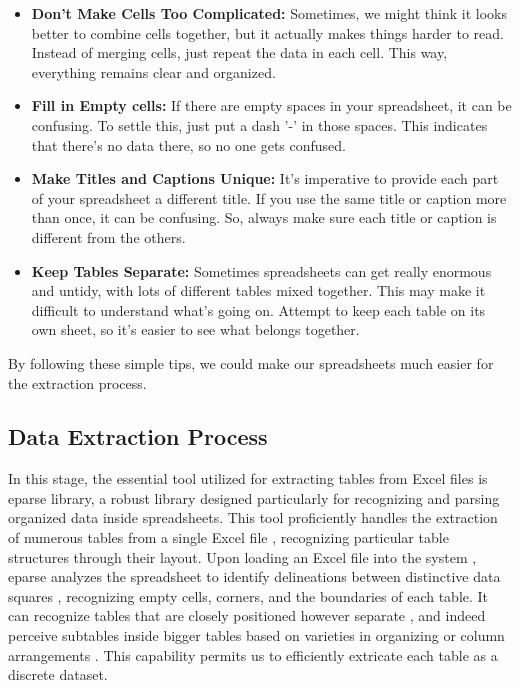 \begin{itemize}
    \item \textbf{Don't Make Cells Too Complicated:} Sometimes, we might think it looks better to combine cells together, but it actually makes things harder to read. Instead of merging cells, just repeat the data in each cell. This way, everything remains clear and organized.
    
    \item \textbf{Fill in Empty cells:} If there are empty spaces in your spreadsheet, it can be confusing. To settle this, just put a dash '-' in those spaces. This indicates that there's no data there, so no one gets confused.
    
    \item \textbf{Make Titles and Captions Unique:} It's imperative to provide each part of your spreadsheet a different title. If you use the same title or caption more than once, it can be confusing. So, always make sure each title or caption is different from the others.
    
    \item \textbf{Keep Tables Separate:} Sometimes spreadsheets can get really enormous and untidy, with lots of different tables mixed together. This may make it difficult to understand what's going on. Attempt to keep each table on its own sheet, so it's easier to see what belongs together.
\end{itemize}

By following these simple tips, we could make our spreadsheets much easier for the extraction process.
\subsection{Data Extraction Process}

In this stage, the essential tool utilized for extracting tables from Excel files is eparse library, a robust library designed particularly for recognizing and parsing organized data inside spreadsheets. This tool proficiently handles the extraction of numerous tables from a single Excel file , recognizing particular table structures through their layout. Upon loading an Excel file into the system , eparse analyzes the spreadsheet to identify delineations between distinctive data squares , recognizing empty cells, corners, and the boundaries of each table. It can recognize tables that are closely positioned however separate , and indeed perceive subtables inside bigger tables based on varieties in organizing or column arrangements . This capability permits us to efficiently extricate each table as a discrete dataset.


